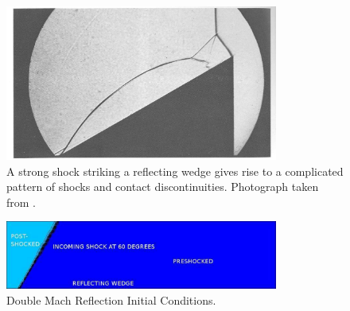 \begin{figure}[t]
\centering
\includegraphics[width=0.8\textwidth]{dmr_experimental}
\caption{
A strong shock striking a reflecting wedge gives rise to a complicated pattern of shocks and contact discontinuities. Photograph taken from \citet{1964VanDyke}.
}
\label{fig:DMRExperimental} %
\end{figure}


\begin{figure}[t]
\centering
\includegraphics[width=0.8\textwidth]{dmr_initial_conditions}
\caption{
Double Mach Reflection Initial Conditions.
}
\label{fig:DMRInitial} %
\end{figure}

